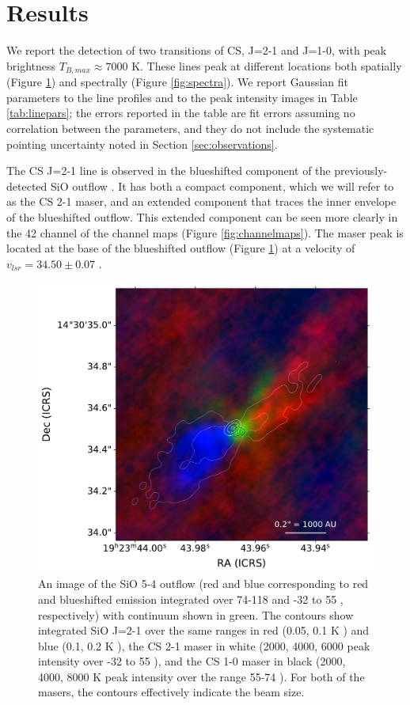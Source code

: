 \documentclass[twocolumn]{aastex62}
\begin{document}
\section{Results}
We report the detection of two transitions of CS, J=2-1 and J=1-0, with
peak brightness $T_{B,max}\approx7000$ K.
These lines peak at different locations both spatially (Figure
\ref{fig:overlay}) and spectrally (Figure \ref{fig:spectra}).
We report Gaussian fit parameters to the line profiles and to the peak intensity
images in Table \ref{tab:linepars}; the errors reported in the table are fit
errors assuming no correlation between the parameters, and they do not include
the systematic pointing uncertainty noted in Section \ref{sec:observations}.

The CS J=2-1 line is observed in the blueshifted component of the
previously-detected SiO outflow \citep{Goddi2018a}.
It has both a compact component, which we will refer to as the CS 2-1 maser,
and an extended component that traces the inner envelope of the blueshifted
outflow.  This extended component can be seen more clearly in the 42 \kms
channel of the channel maps (Figure \ref{fig:channelmaps}).  The maser
peak is located at the base of the blueshifted outflow (Figure
\ref{fig:overlay}) at a velocity of $v_{lsr}=34.50\pm0.07$ \kms.

\begin{figure}[htp]
    \includegraphics[width=\textwidth]{figures/W51e2e_sio_outflow_with_CS_contours.pdf}
    \caption{An image of the SiO 5-4 outflow (red and blue corresponding to
    red and blueshifted emission integrated over 74-118 \kms and -32 to 55
    \kms, respectively) with continuum shown in green.  The contours show
    integrated SiO J=2-1 over the same ranges in red (0.05, 0.1 K \kms) and
    blue (0.1, 0.2 K \kms), the CS 2-1
    maser in white (2000, 4000, 6000 peak intensity over -32 to 55 \kms),
    and the CS 1-0 maser in black (2000, 4000, 8000 K peak intensity over
    the range 55-74 \kms).  For both of the masers, the contours effectively
    indicate the beam size.}
    \label{fig:overlay}
\end{figure}
\end{document}
